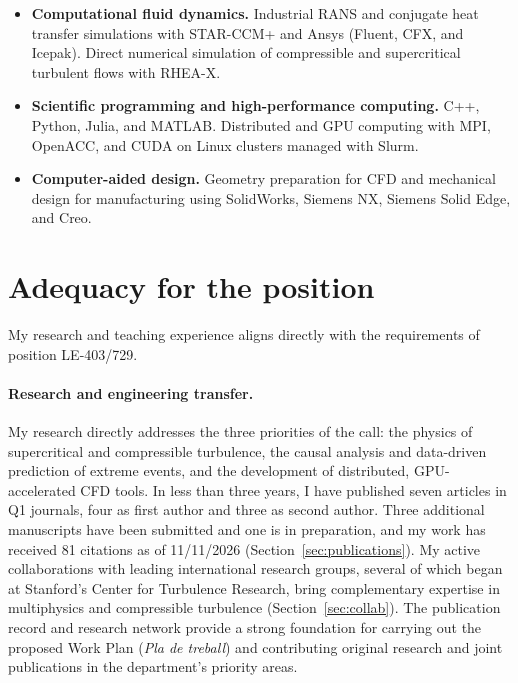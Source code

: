 \documentclass[11pt]{article}
\begin{document}
\begin{itemize}[itemsep=2pt]
	\item \textbf{Computational fluid dynamics.} Industrial RANS and
	conjugate heat transfer simulations with STAR-CCM+ and Ansys (Fluent,
	CFX, and Icepak). Direct numerical simulation of compressible and
	supercritical turbulent flows with RHEA-X.
	\item \textbf{Scientific programming and high-performance computing.}
	C++, Python, Julia, and MATLAB. Distributed and GPU computing with
	MPI, OpenACC, and CUDA on Linux clusters managed with Slurm.
	\item \textbf{Computer-aided design.} Geometry preparation for CFD and
	mechanical design for manufacturing using SolidWorks, Siemens NX,
	Siemens Solid Edge, and Creo.
\end{itemize}


\section{Adequacy for the position}\label{sec:adequacy}

My research and teaching experience aligns directly with the requirements of position LE-403/729. 

\paragraph{Research and engineering transfer.}

My research directly addresses the three priorities of the call: the physics of supercritical and compressible turbulence, the causal analysis and data-driven prediction of extreme events, and the development of distributed, GPU-accelerated CFD tools. 
In less than three years, I have published seven articles in Q1 journals, four as first author and three as second author. 
Three additional manuscripts have been submitted and one is in preparation, and my work has received 81 citations as of 11/11/2026 (Section~\ref{sec:publications}).
My active collaborations with leading international research groups, several of which began at Stanford's Center for Turbulence Research, bring complementary expertise in multiphysics and compressible turbulence (Section~\ref{sec:collab}). 
The publication record and research network provide a strong foundation for carrying out the proposed Work Plan (\textit{Pla de treball}) and contributing original research and joint
publications in the department's priority areas.
\end{document}
